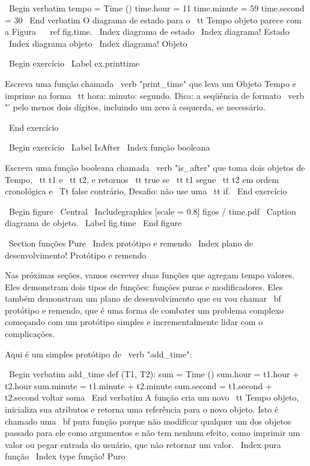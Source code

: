 \documentclass[10pt]{book}
\begin{document}
{{{{{{{{{{{{{\ Begin {verbatim}
tempo = Time ()
time.hour = 11
time.minute = 59
time.second = 30
\ End {verbatim}
%
O diagrama de estado para o {\ tt Tempo} objeto parece com a Figura ~ \ ref {} fig.time.
\ Index {diagrama de estado}
\ Index {diagrama! Estado}
\ Index {diagrama objeto}
\ Index {diagrama! Objeto}

\ Begin {} exercício
\ Label {} ex.printtime

Escreva uma função chamada \ verb "print_time" que leva um 
Objeto Tempo e imprime na forma {\ tt hora: minuto: segundo}.
Dica: a seqüência de formato \ verb "'%
pelo menos dois dígitos, incluindo um zero à esquerda, se necessário.

\ End {} exercício

\ Begin {} exercício
\ Label {} IsAfter
\ Index {função booleana}

Escreva uma função booleana chamada \ verb "is_after" que
toma dois objetos de Tempo, {\ tt t1} e {\ tt t2}, e
retornos {\ tt true} se {\ tt t1} segue {\ tt t2} em ordem cronológica e
{\ Tt false} contrário. Desafio: não use uma {\ tt if}.
\ End {} exercício

\ Begin {figure}
\ Central
{\ Includegraphics [scale = 0.8] {figos / time.pdf}}
\ Caption {diagrama de objeto.}
\ Label {} fig.time
\ End {figure}


\ Section {funções Pure}
\ Index {protótipo e remendo}
\ Index {plano de desenvolvimento! Protótipo e remendo}

Nas próximas seções, vamos escrever duas funções que agregam tempo
valores. Eles demonstram dois tipos de funções: funções puras e
modificadores. Eles também demonstram um plano de desenvolvimento que eu vou chamar {\ bf
  protótipo e remendo}, que é uma forma de combater um problema complexo
começando com um protótipo simples e incrementalmente lidar com o
complicações.

Aqui é um simples protótipo de \ verb "add_time":

\ Begin {verbatim}
add_time def (T1, T2):
    sum = Time ()
    sum.hour = t1.hour + t2.hour
    sum.minute = t1.minute + t2.minute
    sum.second = t1.second + t2.second
    voltar soma
\ End {verbatim}
%
A função cria um novo {\ tt Tempo} objeto, inicializa sua
atributos e retorna uma referência para o novo objeto. Isto é chamado
uma {\ bf pura função} porque não modificar qualquer um dos objetos
passado para ele como argumentos e não tem nenhum efeito,
como imprimir um valor ou pegar entrada do usuário, 
que não retornar um valor.
\ Index {pura função}
\ Index {type função! Puro}

}}}}}}}}}}}}}
\end{document}
